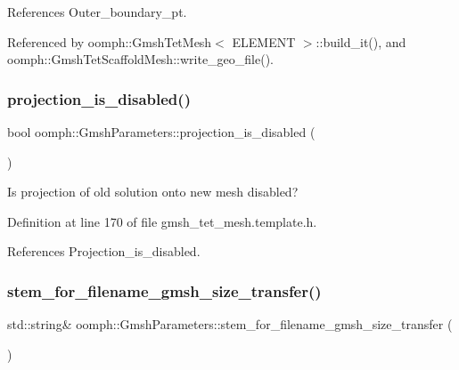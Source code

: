 References Outer\+\_\+boundary\+\_\+pt.



Referenced by oomph\+::\+Gmsh\+Tet\+Mesh$<$ E\+L\+E\+M\+E\+N\+T $>$\+::build\+\_\+it(), and oomph\+::\+Gmsh\+Tet\+Scaffold\+Mesh\+::write\+\_\+geo\+\_\+file().

\mbox{\label{classoomph_1_1GmshParameters_ac8b37d79ebc135382c2320c3ba405a3f}} 
\subsubsection{\texorpdfstring{projection\+\_\+is\+\_\+disabled()}{projection\_is\_disabled()}}
{\footnotesize\ttfamily bool oomph\+::\+Gmsh\+Parameters\+::projection\+\_\+is\+\_\+disabled (\begin{DoxyParamCaption}{ }\end{DoxyParamCaption})\hspace{0.3cm}{\ttfamily [inline]}}



Is projection of old solution onto new mesh disabled? 



Definition at line 170 of file gmsh\+\_\+tet\+\_\+mesh.\+template.\+h.



References Projection\+\_\+is\+\_\+disabled.

\mbox{\label{classoomph_1_1GmshParameters_a6006bbce01fab0e48e474f077fc926e7}} 
\subsubsection{\texorpdfstring{stem\+\_\+for\+\_\+filename\+\_\+gmsh\+\_\+size\+\_\+transfer()}{stem\_for\_filename\_gmsh\_size\_transfer()}}
{\footnotesize\ttfamily std\+::string\& oomph\+::\+Gmsh\+Parameters\+::stem\+\_\+for\+\_\+filename\+\_\+gmsh\+\_\+size\+\_\+transfer (\begin{DoxyParamCaption}{ }\end{DoxyParamCaption})\hspace{0.3cm}{\ttfamily [inline]}}



